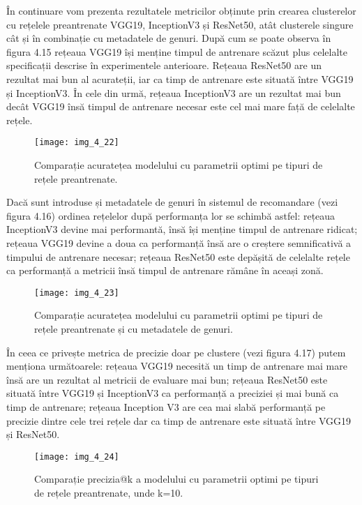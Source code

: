 \vspace{5mm}
În continuare vom prezenta rezultatele metricilor obținute prin crearea clusterelor cu rețelele preantrenate VGG19, InceptionV3 și ResNet50, atât clusterele singure cât și în combinație cu metadatele de genuri. După cum se poate observa în figura 4.15 rețeaua VGG19 își menține timpul de antrenare scăzut plus celelalte specificații descrise în experimentele anterioare. Rețeaua ResNet50 are un rezultat mai bun al acurateții, iar ca timp de antrenare este situată între VGG19 și InceptionV3. În cele din urmă, rețeaua InceptionV3 are un rezultat mai bun decât VGG19 însă timpul de antrenare necesar este cel mai mare față de celelalte rețele.
\begin{figure}[!h]
	\centering
	\texttt{[image: img\_4\_22]}
	\caption[Comparație acuratețea modelului cu parametrii optimi pe tipuri de rețele preantrenate]{Comparație acuratețea modelului cu parametrii optimi pe tipuri de rețele preantrenate.}
\end{figure}

Dacă sunt introduse și metadatele de genuri în sistemul de recomandare (vezi figura 4.16) ordinea rețelelor după performanța lor se schimbă astfel: rețeaua InceptionV3 devine mai performantă, însă își menține timpul de antrenare ridicat; rețeaua VGG19 devine a doua ca performanță însă are o creștere semnificativă a timpului de antrenare necesar; rețeaua ResNet50 este depășită de celelalte rețele ca performanță a metricii însă timpul de antrenare rămâne în aceași zonă.
\begin{figure}[!h]
	\centering
	\texttt{[image: img\_4\_23]}
	\caption[Comparație acuratețea modelului cu parametrii optimi pe tipuri de rețele preantrenate și cu metadatele de genuri]{Comparație acuratețea modelului cu parametrii optimi pe tipuri de rețele preantrenate și cu metadatele de genuri.}
\end{figure}

În ceea ce privește metrica de precizie doar pe clustere (vezi figura 4.17) putem menționa următoarele: rețeaua VGG19 necesită un timp de antrenare mai mare însă are un rezultat al metricii de evaluare mai bun; rețeaua ResNet50 este situată între VGG19 și InceptionV3 ca performanță a preciziei și mai bună ca timp de antrenare; rețeaua Inception V3 are cea mai slabă performanță pe precizie dintre cele trei rețele dar ca timp de antrenare este situată între VGG19 și ResNet50.
\begin{figure}[!h]
	\centering
	\texttt{[image: img\_4\_24]}
	\caption[Comparație precizia@k a modelului cu parametrii optimi pe tipuri de rețele preantrenate]{Comparație precizia@k a modelului cu parametrii optimi pe tipuri de rețele preantrenate, unde k=10.}
\end{figure}

